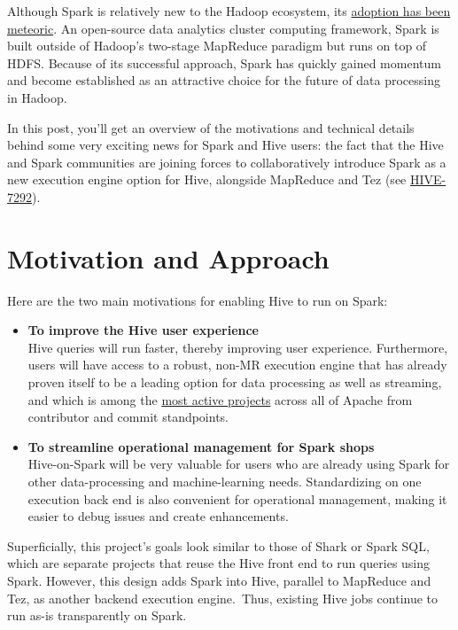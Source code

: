 \documentclass{vldb}
\begin{document}
Although Spark is relatively new to the Hadoop ecosystem, its
\href{https://cwiki.apache.org/confluence/display/SPARK/Powered+By+Spark}{adoption
has been meteoric}. An open-source data analytics cluster computing
framework, Spark is built outside of Hadoop's two-stage MapReduce
paradigm but runs on top of HDFS. Because of its successful approach,
Spark has quickly gained momentum and become established as an
attractive choice for the future of data processing in Hadoop.

In this post, you'll get an overview of the motivations and technical
details behind some very exciting news for Spark and Hive users: the
fact that the Hive and Spark communities are joining forces to
collaboratively introduce Spark as a new execution engine option for
Hive, alongside MapReduce and Tez (see
\href{https://issues.apache.org/jira/browse/HIVE-7292}{HIVE-7292}).

\section{Motivation and Approach}

Here are the two main motivations for enabling Hive to run on Spark:

\begin{itemize}
\itemsep1pt\parskip0pt
\item
  \textbf{To improve the Hive user experience}\\ Hive queries will run
  faster, thereby improving user experience. Furthermore, users will
  have access to a robust, non-MR execution engine that has already
  proven itself to be a leading option for data processing as well as
  streaming, and which is among the
  \href{https://www.ohloh.net/orgs/apache}{most active projects} across
  all of Apache from contributor and commit standpoints.
\item
  \textbf{To streamline operational management for Spark shops}\\
  Hive-on-Spark will be very valuable for users who are already using
  Spark for other data-processing and machine-learning needs.
  Standardizing on one execution back end is also convenient for
  operational management, making it easier to debug issues and create
  enhancements.
\end{itemize}

Superficially, this project's goals look similar to those of Shark or
Spark SQL, which are separate projects that reuse the Hive front end to
run queries using Spark. However, this design adds Spark into Hive,
parallel to MapReduce and Tez, as another backend execution
engine.~Thus, existing Hive jobs continue to run as-is transparently on
Spark.
\end{document}
